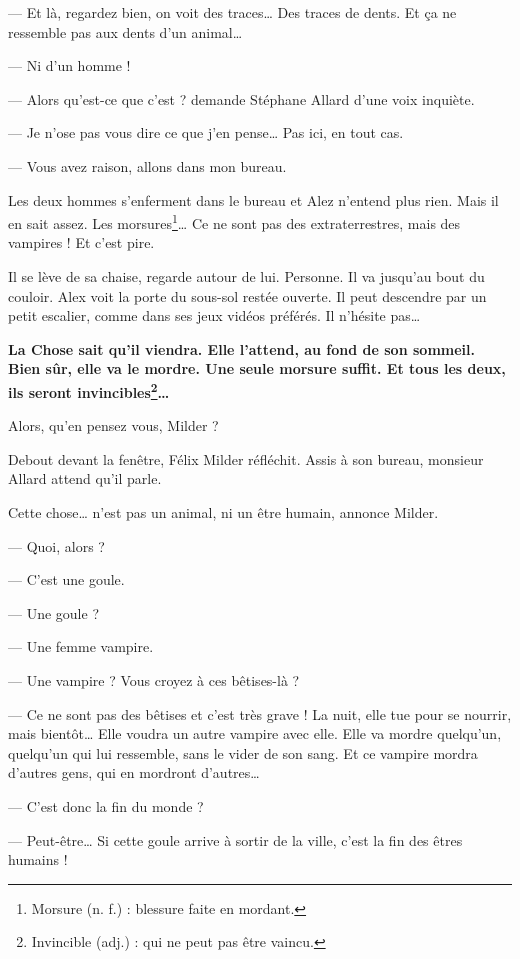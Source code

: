 --- Et là, regardez bien, on voit des traces\ldots{} Des traces de dents. Et \c{c}a ne ressemble pas aux dents d'un animal\ldots{}

--- Ni d'un homme !

--- Alors qu'est-ce que c'est ? demande Stéphane Allard d'une voix inquiète.

--- Je n'ose pas vous dire ce que j'en pense\ldots{} Pas ici, en tout cas.

--- Vous avez raison, allons dans mon bureau. \fg{}

Les deux hommes s'enferment dans le bureau et Alez n'entend plus rien. Mais il en sait assez. Les morsures\footnote{Morsure
(n. f.) : blessure faite en mordant.}\ldots{} Ce ne sont pas des extraterrestres, mais des vampires ! Et c'est pire.

Il se lève de sa chaise, regarde autour de lui. Personne. Il va jusqu'au bout du couloir. Alex voit la porte du sous-sol restée
ouverte. Il peut descendre par un petit escalier, comme dans ses jeux vidéos préférés. Il n'hésite pas\ldots{}

\textbf{La Chose sait qu'il viendra. Elle l'attend, au fond de son sommeil. Bien sûr, elle va le mordre. Une seule morsure suffit.
Et tous les deux, ils seront invincibles\footnote{Invincible (adj.) : qui ne peut pas être vaincu.}\ldots{}}

\og Alors, qu'en pensez vous, Milder ? \fg{}

Debout devant la fenêtre, Félix Milder réfléchit. Assis à son bureau, monsieur Allard attend qu'il parle.

\og Cette chose\ldots{} n'est pas un animal, ni un être humain, annonce Milder.

--- Quoi, alors ?

--- C'est une goule.

--- Une goule ?

--- Une femme vampire.

--- Une vampire ? Vous croyez à ces bêtises-là ?

--- Ce ne sont pas des bêtises et c'est très grave ! La nuit, elle tue pour se nourrir, mais bientôt\ldots{} Elle voudra un autre
    vampire avec elle. Elle va mordre quelqu'un, quelqu'un qui lui ressemble, sans le vider de son sang. Et ce vampire mordra
    d'autres gens, qui en mordront d'autres\ldots{}

--- C'est donc la fin du monde ?

--- Peut-être\ldots{} Si cette goule arrive à sortir de la ville, c'est la fin des êtres humains !

